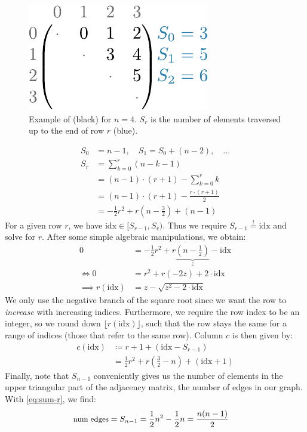 \begin{figure}[H]
    \centering
    \includegraphics[width=0.45\linewidth]{assets/illustrator/sum-example.pdf}
    \caption{Example of  (black) for $n=4$. $S_r$ is the number of elements traversed up to the end of row $r$ (blue).}
    \label{fig:sum-example}
\end{figure}

\vspace{-3em}

\begin{align}
    S_0 &= n-1, \quad S_1 = S_0 + (n-2), \quad\ldots\\
    S_r &= \sum_{k=0}^{r} (n-k-1)\\[-10pt]
    &= (n-1) \cdot (r+1) - \sum_{k=0}^{r} k\\[-2pt]
    &= (n-1) \cdot (r+1) - \frac{r \cdot (r+1)}{2}\\[-4pt]
    &= -\frac{1}{2}r^2 + r \left(n- \frac{3}{2}\right) + (n-1)
    \label{eq:sum-r}
\end{align}
For a given row $r$, we have $\text{idx} \in [S_{r-1}, S_r)$. Thus we require $S_{r-1} \overset{!}{=} \text{idx}$ and solve for $r$. After some simple algebraic manipulations, we obtain:
\begin{align}
    0 &= -\frac{1}{2} r^2 + r \underbrace{\left(n - \frac{1}{2}\right)}_z - \text{idx}\\
    \iff 0 &= r^2 + r (-2z) + 2 \cdot \text{idx}\\
    \implies r(\text{idx}) &= z - \sqrt{z^2 - 2\cdot \text{idx}}
    \label{eq:row-index}
\end{align}
We only use the negative branch of the square root since we want the row to \textit{increase} with increasing indices. Furthermore, we require the row index to be an integer, so we round down $\lfloor r(\text{idx}) \rfloor$, such that the row stays the same for a range of indices (those that refer to the same row). Column $c$ is then given by:
\begin{align}
    c(\text{idx}) &\coloneqq r + 1 + (\text{idx} - S_{r-1})\\
    &= \frac{1}{2} r^2 + r \left(\frac{3}{2} - n\right) + (\text{idx} + 1)
    \label{eq:col-index}
\end{align}
Finally, note that $S_{n-1}$ conveniently gives us the number of elements in the upper triangular part of the adjacency matrix, \ie the number of edges in our graph. With \eqref{eq:sum-r}, we find:
\begin{align}
    \small{\text{num edges}}
    &= S_{n-1} = \frac{1}{2} n^2 - \frac{1}{2} n
    = \frac{n(n-1)}{2}
    \label{eq:num-edges}
\end{align}

